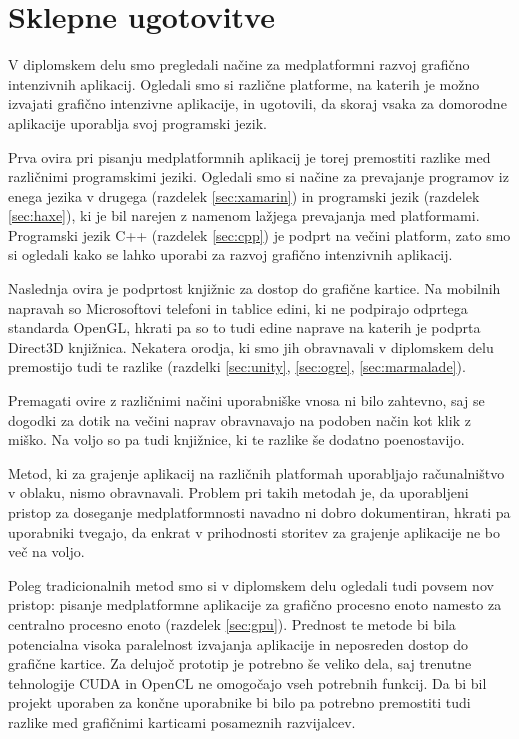\chapter{Sklepne ugotovitve}

V diplomskem delu smo pregledali načine za medplatformni razvoj grafično intenzivnih aplikacij. Ogledali smo si različne platforme, na katerih je možno izvajati grafično intenzivne aplikacije, in ugotovili, da skoraj vsaka za domorodne aplikacije uporablja svoj programski jezik. 

Prva ovira pri pisanju medplatformnih aplikacij je torej premostiti razlike med različnimi programskimi jeziki. Ogledali smo si načine za prevajanje programov iz enega jezika v drugega (razdelek \ref{sec:xamarin}) in programski jezik (razdelek \ref{sec:haxe}), ki je bil narejen z namenom lažjega prevajanja med platformami. Programski jezik C++ (razdelek \ref{sec:cpp}) je podprt na večini platform, zato smo si ogledali kako se lahko uporabi za razvoj grafično intenzivnih aplikacij.

Naslednja ovira je podprtost knjižnic za dostop do grafične kartice. Na mobilnih napravah so Microsoftovi telefoni in tablice edini, ki ne podpirajo odprtega standarda OpenGL, hkrati pa so to tudi edine naprave na katerih je podprta Direct3D knjižnica. Nekatera orodja, ki smo jih obravnavali v diplomskem delu premostijo tudi te razlike (razdelki \ref{sec:unity}, \ref{sec:ogre}, \ref{sec:marmalade}).

Premagati ovire z različnimi načini uporabniške vnosa ni bilo zahtevno, saj se dogodki za dotik na večini naprav obravnavajo na podoben način kot klik z miško. Na voljo so pa tudi knjižnice, ki te razlike še dodatno poenostavijo.

Metod, ki za grajenje aplikacij na različnih platformah uporabljajo računalništvo v oblaku, nismo obravnavali. Problem pri takih metodah je, da uporabljeni pristop za doseganje medplatformnosti navadno ni dobro dokumentiran, hkrati pa uporabniki tvegajo, da enkrat v prihodnosti storitev za grajenje aplikacije ne bo več na voljo.  

Poleg tradicionalnih metod smo si v diplomskem delu ogledali tudi povsem nov pristop: pisanje medplatformne aplikacije za grafično procesno enoto namesto za centralno procesno enoto (razdelek \ref{sec:gpu}). Prednost te metode bi bila potencialna visoka paralelnost izvajanja aplikacije in neposreden dostop do grafične kartice. Za delujoč prototip je potrebno še veliko dela, saj trenutne tehnologije CUDA in OpenCL ne omogočajo vseh potrebnih funkcij. Da bi bil projekt uporaben za končne uporabnike bi bilo pa potrebno premostiti tudi razlike med grafičnimi karticami posameznih razvijalcev. 

